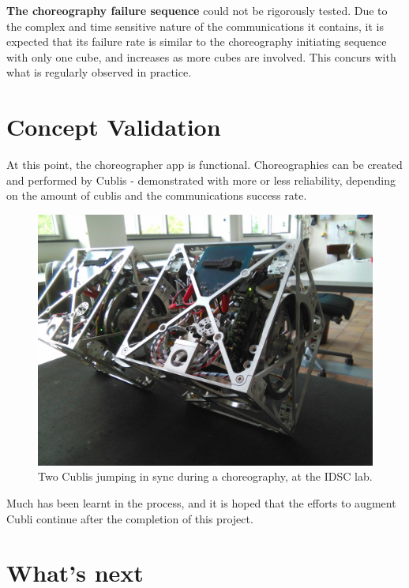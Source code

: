 \textbf{The choreography failure sequence} could not be rigorously tested. Due to the complex and time sensitive nature of the communications it contains, it is expected that its failure rate is similar to the choreography initiating sequence with only one cube, and increases as more cubes are involved. This concurs with what is regularly observed in practice.

\section{Concept Validation}

At this point, the choreographer app is functional. Choreographies can be created and performed by Cublis - demonstrated with more or less reliability, depending on the amount of cublis and the communications success rate.\\

\begin{figure}[H]
   \centering
   \includegraphics[width=1\textwidth]{img/Performing.jpg}
   \caption{Two Cublis jumping in sync during a choreography, at the IDSC lab.}
   \label{img:performing}
\end{figure}

Much has been learnt in the process, and it is hoped that the efforts to augment Cubli continue after the completion of this project.

\section{What's next}

